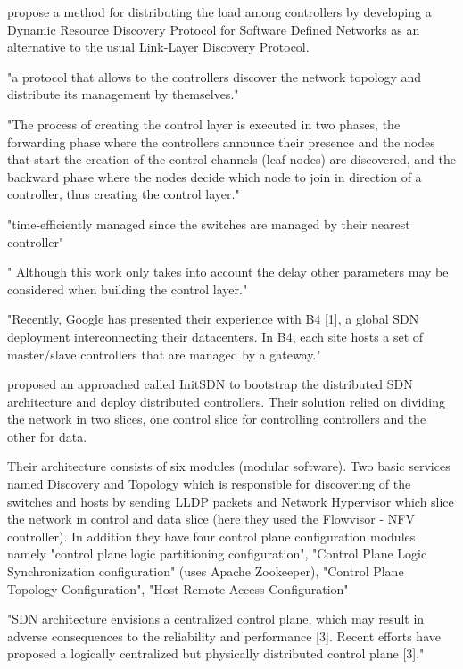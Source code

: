 \cite{DRDP_for_SDN} propose a method for distributing the load among controllers by developing a Dynamic Resource Discovery Protocol for Software Defined Networks as an alternative to the usual Link-Layer Discovery Protocol. 

"a protocol that allows to the controllers discover the network topology and distribute its management by themselves." 

"The process of creating the control layer is executed in two phases, the forwarding phase where the controllers announce their presence and the nodes that start the creation of the control channels (leaf nodes) are discovered, and the backward phase where the nodes decide which node to join in direction of a controller, thus creating the control layer."

"time-efficiently managed since the switches are managed by their nearest controller"

" Although this work only takes into account the delay other parameters may be considered when building the control layer."


"Recently, Google has presented their experience with B4 [1], a global SDN deployment interconnecting their datacenters. In B4, each site hosts a set of master/slave controllers that are managed by a gateway." 


\cite{Bootstrapping_SDN_Controllers} proposed an approached called InitSDN to bootstrap the distributed SDN architecture and deploy distributed controllers. Their solution relied on dividing the network in two slices, one control slice for controlling controllers and the other for data. 

Their architecture consists of six modules (modular software). Two basic services named Discovery and Topology which is responsible for discovering of the switches and hosts by sending LLDP packets and Network Hypervisor which slice the network in control and data slice (here they used the Flowvisor - NFV controller). In addition they have four control plane configuration modules namely "control plane logic partitioning configuration", "Control Plane Logic Synchronization configuration" (uses Apache Zookeeper), "Control Plane Topology Configuration", "Host Remote Access Configuration"

"SDN architecture envisions a centralized control plane, which may result in adverse consequences to the reliability and performance [3]. Recent efforts have proposed a logically centralized but physically distributed control plane [3]."


